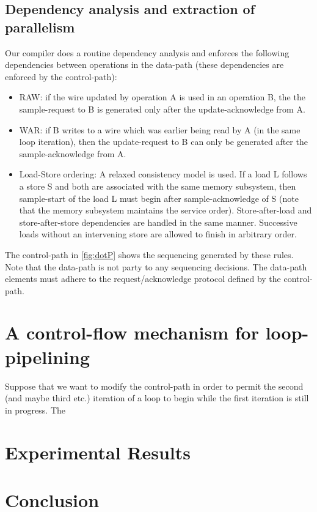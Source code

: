 \documentclass[conference]{IEEEtran}
\begin{document}
\subsection{Dependency analysis and extraction of parallelism}

Our compiler does a routine dependency analysis and enforces
the following dependencies between operations in the
data-path (these dependencies are enforced by the control-path):
\begin{itemize}
\item RAW: if the wire updated by operation A is used in an
operation B, the the sample-request to B is generated only
after the update-acknowledge from A.
\item WAR: if B writes to a wire which was earlier being read
by A (in the same loop iteration), then the update-request to B
can only be generated after the sample-acknowledge from A.
\item Load-Store ordering: A relaxed consistency model
is used.  If a load L follows a store S
and both are associated with the same memory subsystem, then
sample-start of the load L must begin after sample-acknowledge
of S (note that the memory subsystem maintains the service order).
Store-after-load and store-after-store dependencies are
handled in the same manner.  Successive loads without
an intervening store are allowed to finish in arbitrary order.
\end{itemize}

The control-path in \ref{fig:dotP} shows the sequencing
generated by these rules.  Note that the data-path
is not party to any sequencing decisions.  The data-path
elements must adhere to the request/acknowledge protocol
defined by the control-path.

\section{A control-flow mechanism for loop-pipelining}

Suppose that we want to modify the control-path in order to
permit the second (and maybe third etc.) iteration of a loop
to begin while the first iteration is still in progress.  
The 

\section{Experimental Results}


\section{Conclusion}




\end{document}

